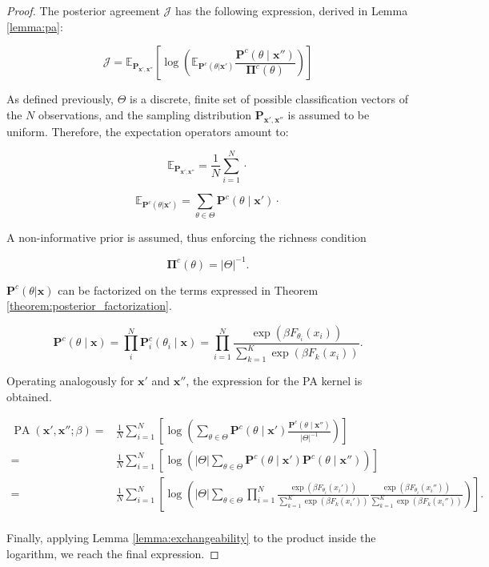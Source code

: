 \begin{proof}
    The posterior agreement $\mathcal{J}$ has the following expression, derived in Lemma \ref{lemma:pa}:

    $$
    \mathcal{J} =\mathbb{E}_{\mathbf{P}_{\bm{x}', \bm{x}''}}\left[\log\left(\mathbb{E}_{\mathbf{P}^c(\theta|\bm{x}')}\frac{\mathbf{P}^c(\theta\mid \bm{x}'')}{\mathbf{\Pi}^c(\theta)}\right)\right]
    $$

    As defined previously, $\Theta$ is a discrete, finite set of possible classification 
    vectors of the $N$ observations, and the sampling distribution $\mathbf{P}_{\bm{x}', \bm{x}''}$ is 
    assumed to be uniform. Therefore, the expectation operators amount to:

    $$
    \mathbb{E}_{\mathbf{P}_{\bm{x}', \bm{x}''}} = \frac{1}{N} \sum_{i=1}^N \cdot
    $$

    $$
    \mathbb{E}_{\mathbf{P}^c(\theta|\bm{x}')} = \sum_{\theta \in \Theta} \mathbf{P}^c(\theta \mid \bm{x}') \cdot
    $$

    A non-informative prior is assumed, thus enforcing the richness condition

    $$
    \mathbf{\Pi}^c(\theta) = |\Theta|^{-1}.
    $$

    $\mathbf{P}^c(\theta|\bm{x})$ can be factorized on the terms expressed in Theorem \ref{theorem:posterior_factorization}.

    $$
    \mathbf{P}^c(\theta \mid \bm{x}) = \prod_i^N  \mathbf{P}_i^c(\theta_i \mid \bm{x}) = \prod_{i=1}^N \frac{\exp\left(\beta F_{\theta_i}(x_i)\right)}{\sum_{k=1}^K\exp\left(\beta F_k(x_i)\right)}.
    $$

    Operating analogously for $\bm{x}'$ and $\bm{x}''$, the expression for the PA kernel is obtained.

    $$
    \begin{aligned}
    \operatorname{PA}\left(\bm{x}', \bm{x}'' ; \beta\right) = & \frac{1}{N} \sum_{i=1}^N \left[\log\left(\sum_{\theta \in \Theta} \mathbf{P}^c(\theta \mid \bm{x}') \frac{\mathbf{P}^c(\theta\mid \bm{x}'')}{|\Theta|^{-1}}\right)\right] \\
    = & \frac{1}{N} \sum_{i=1}^N \left[\log\left( |\Theta| \sum_{\theta \in \Theta} \mathbf{P}^c(\theta \mid \bm{x}') \mathbf{P}^c(\theta\mid \bm{x}'')\right)\right] \\
    = & \frac{1}{N} \sum_{i=1}^N \left[\log \left( |\Theta| \sum_{\theta \in \Theta} \prod_{i=1}^N \frac{\exp\left(\beta F_{\theta_i}(x_i')\right)}{\sum_{k=1}^K\exp\left(\beta F_k(x_i')\right)} \frac{\exp\left(\beta F_{\theta_i}(x_i'')\right)}{\sum_{k=1}^K\exp\left(\beta F_k(x_i'')\right)} \right)\right]. \\
    \end{aligned}
    $$

    Finally, applying Lemma \ref{lemma:exchangeability} to the product inside the 
    logarithm, we reach the final expression.

\end{proof}

